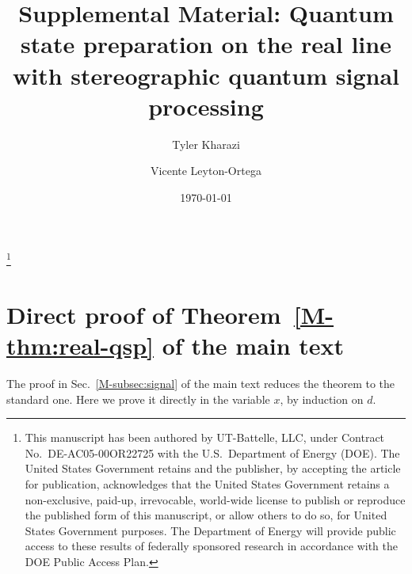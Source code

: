\documentclass[
    reprint,
    amsmath,amssymb,
    aps,
    pra,
    superscriptaddress,
    floatfix
]{revtex4-2}
\theoremstyle{aps}
\begin{document}
\title{Supplemental Material: Quantum state preparation on the real line with stereographic quantum signal processing}

\thanks{This manuscript has been authored by UT-Battelle, LLC, under Contract No.\ DE-AC05-00OR22725 with the U.S.\ Department of Energy (DOE). The United States Government retains and the publisher, by accepting the article for publication, acknowledges that the United States Government retains a non-exclusive, paid-up, irrevocable, world-wide license to publish or reproduce the published form of this manuscript, or allow others to do so, for United States Government purposes. The Department of Energy will provide public access to these results of federally sponsored research in accordance with the DOE Public Access Plan.}

\author{Tyler Kharazi}

\author{Vicente Leyton-Ortega}

\date{\today}

\maketitle

\section{Direct proof of Theorem~\ref{M-thm:real-qsp} of the main text}
\label{app:thm-real}

The proof in Sec.~\ref{M-subsec:signal} of the main text reduces the theorem to the
standard one.  Here we prove it directly in the variable $x$, by
induction on $d$.
\end{document}

